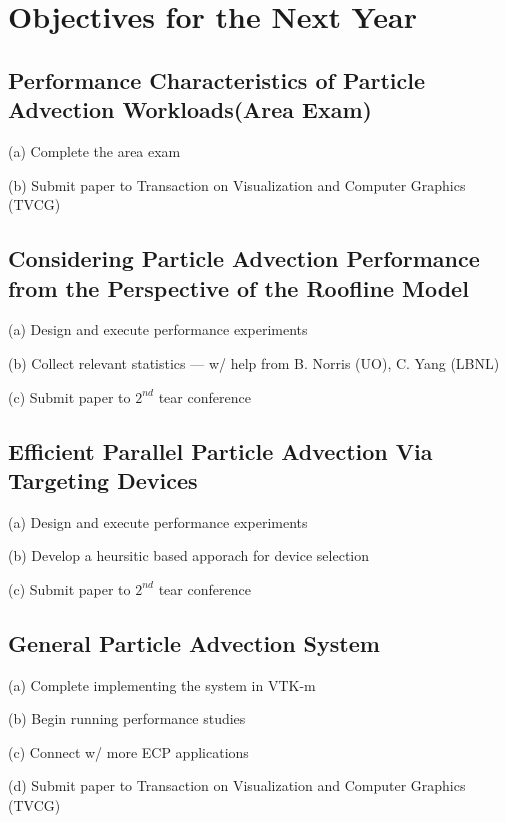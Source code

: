 \documentclass{article}
\begin{document}
\section{Objectives for the Next Year}

\subsection{Performance Characteristics of Particle Advection Workloads(Area Exam)}
(a) Complete the area exam

(b) Submit paper to Transaction on Visualization and Computer Graphics (TVCG)

\subsection{Considering Particle Advection Performance from the Perspective of the Roofline Model}
(a) Design and execute performance experiments

(b) Collect relevant statistics --- w/ help from B. Norris (UO), C. Yang (LBNL)

(c) Submit paper to $2^{nd}$ tear conference

\subsection{Efficient Parallel Particle Advection Via Targeting Devices}
(a) Design and execute performance experiments

(b) Develop a heursitic based apporach for device selection

(c) Submit paper to $2^{nd}$ tear conference


\subsection{General Particle Advection System}
(a) Complete implementing the system in VTK-m

(b) Begin running performance studies

(c) Connect w/ more ECP applications

(d) Submit paper to Transaction on Visualization and Computer Graphics (TVCG)
\end{document}
